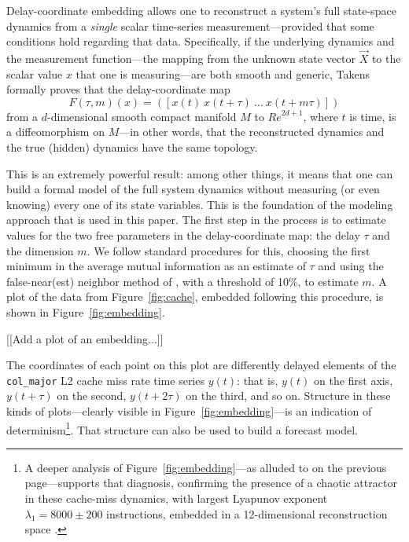 \documentclass{article}
\begin{document}

Delay-coordinate embedding allows one to reconstruct a system's full
state-space dynamics from a \emph{single} scalar time-series
measurement---provided that some conditions hold regarding that data.
Specifically, if the underlying dynamics and the measurement
function---the mapping from the unknown state vector $\vec{X}$ to the
scalar value $x$ that one is measuring---are both smooth and generic,
Takens~\cite{takens} formally proves that the delay-coordinate map
\[
F(\tau,m)(x) = ([x(t) ~ x(t+\tau) ~ \dots ~x(t+m\tau)])
\]
from a $d$-dimensional smooth compact manifold $M$ to ${Re}^{2d+1}$,
where $t$ is time, is a diffeomorphism on $M$---in other words, that
the reconstructed dynamics and the true (hidden) dynamics have the
same topology.

This is an extremely powerful result: among other things, it means
that one can build a formal model of the full system dynamics without
measuring (or even knowing) every one of its state variables.  This is
the foundation of the modeling approach that is used in this paper.
The first step in the process is to estimate values for the two free
parameters in the delay-coordinate map: the delay $\tau$ and the
dimension $m$.  We follow standard procedures for this, choosing the
first minimum in the average mutual information as an estimate of
$\tau$ \cite{fraser-swinney} and using the false-near(est) neighbor
method of \cite{KBA92}, with a threshold of 10\%, to estimate $m$.  A
plot of the data from Figure~\ref{fig:cache}, embedded following this
procedure, is shown in Figure~\ref{fig:embedding}.

[[Add a plot of an embedding...]]

The coordinates of each point on this plot are differently delayed
elements of the \verb|col_major| L2 cache miss rate time series
$y(t)$: that is, $y(t)$ on the first axis, $y(t+\tau)$ on the second,
$y(t+2\tau)$ on the third, and so on.
Structure in these kinds of plots---clearly visible in
Figure~\ref{fig:embedding}---is an indication of
determinism\footnote{A deeper analysis of
  Figure~\ref{fig:embedding}---as alluded to on the previous
  page---supports that diagnosis, confirming the presence of a chaotic
  attractor in these cache-miss dynamics, with largest Lyapunov
  exponent $\lambda_1 = 8000 \pm 200$ instructions, embedded in a
  12-dimensional reconstruction space \cite{mytkowicz09}.}.  That
structure can also be used to build a forecast model.
\end{document}
